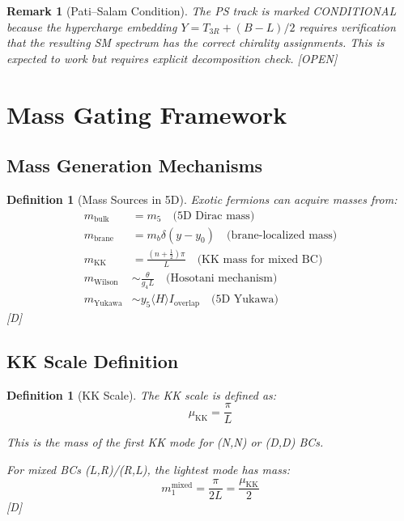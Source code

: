 \documentclass[11pt,a4paper]{article}
\newtheorem{definition}[theorem]{Definition}
\newtheorem{remark}[theorem]{Remark}
\newcommand{\tagD}{\textcolor{blue!70!black}{[D]}}
\newcommand{\tagOPEN}{\textcolor{red!70!black}{[OPEN]}}
\begin{document}
\begin{remark}[Pati--Salam Condition]
\label{rem:ps-condition}
The PS track is marked CONDITIONAL because the hypercharge embedding
$Y = T_{3R} + (B-L)/2$ requires verification that the resulting SM spectrum
has the correct chirality assignments. This is expected to work but requires
explicit decomposition check. \tagOPEN
\end{remark}

\section{Mass Gating Framework}
\label{sec:mass-gating}

\subsection{Mass Generation Mechanisms}

\begin{definition}[Mass Sources in 5D]
\label{def:mass-sources}
Exotic fermions can acquire masses from:
\begin{align}
\label{eq:mass-bulk}
m_{\text{bulk}} &= m_5 \quad \text{(5D Dirac mass)} \\
\label{eq:mass-brane}
m_{\text{brane}} &= m_b \delta(y - y_0) \quad \text{(brane-localized mass)} \\
\label{eq:mass-kk}
m_{\text{KK}} &= \frac{(n + \tfrac{1}{2})\pi}{L} \quad \text{(KK mass for mixed BC)} \\
\label{eq:mass-wilson}
m_{\text{Wilson}} &\sim \frac{\theta}{g_4 L} \quad \text{(Hosotani mechanism)} \\
\label{eq:mass-yukawa}
m_{\text{Yukawa}} &\sim y_5 \langle H \rangle I_{\text{overlap}} \quad \text{(5D Yukawa)}
\end{align}
\tagD
\end{definition}

\subsection{KK Scale Definition}

\begin{definition}[KK Scale]
\label{def:kk-scale}
The KK scale is defined as:
\begin{equation}
\label{eq:mu-kk}
\mu_{\text{KK}} = \frac{\pi}{L}
\end{equation}

This is the mass of the first KK mode for (N,N) or (D,D) BCs.

For mixed BCs (L,R)/(R,L), the lightest mode has mass:
\begin{equation}
\label{eq:m1-mixed}
m_1^{\text{mixed}} = \frac{\pi}{2L} = \frac{\mu_{\text{KK}}}{2}
\end{equation}
\tagD
\end{definition}
\end{document}
